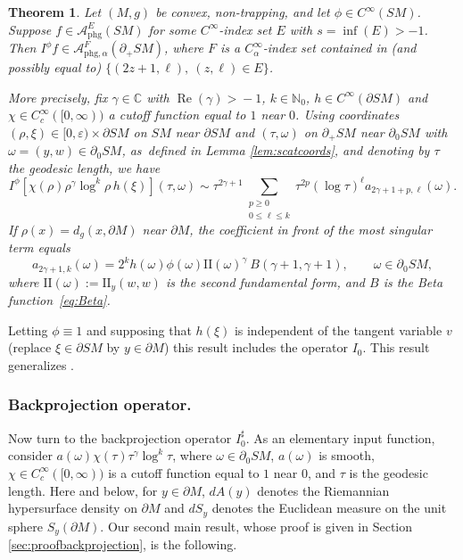 \documentclass[JEP,XML,SOM,Unicode,NoFloatCountersInSection, NoEqCountersInSection,published]{cedram}
\DeclareMathOperator{\Real}{Re}
\theoremstyle{plain}
\newtheorem{Theorem}{Theorem}[section]
\theoremstyle{definition}
\theoremstyle{remark}
\def\Cm{{\mathbb{C}}}
\def\Nm{{\mathbb{N}}}
\def\A{\mathcal{A}}
\def\two{\mathrm{II}}
\newcommand{\adj}{I_0^\sharp}
\newcommand{\del}{\partial}
\newcommand{\phg}{\mathrm{phg}}
\begin{document}
\begin{Theorem} \label{thm:Calphamapping}
Let $(M,g)$ be convex, non-trapping, and let $\phi\in C^\infty(SM)$. Suppose $f \in \A^E_{\phg}(SM)$ for some $C^\infty$-index set $E$ with
$s = \inf(E)>-1$. Then $I^\phi f \in \A^F_{\phg,\alpha}(\del_+ SM)$, where $F$ is a $C^\infty_\alpha$-index set contained in
(and possibly equal to) $\{ (2z+1,\ell), \ (z,\ell)\in E \}$.

More precisely, fix $\gamma\!\!\in\! \Cm$ with $\Real(\gamma)\!>\!-1$, $k\!\!\in\! \Nm_0$, $h\!\!\in\! C^\infty(\partial SM)$ and $\chi\!\!\in\! C_c^\infty([0,\infty))$ a cutoff function equal to $1$ near $0$.
Using coordinates $(\rho,\xi)\in [0,\varepsilon)\times \partial SM$ on $SM$ near $\partial SM$ and $(\tau,\omega)$ on $\partial_+ SM$ near
$\partial_0 SM$ with $\omega = (y,w)\in \partial_0 SM$, as~defined in Lemma \ref{lem:scatcoords}, and denoting by $\tau$ the geodesic length, we have
\begin{equation*}
I^\phi [\chi(\rho)\rho^\gamma \log^k \rho\,h(\xi)] (\tau,\omega) \sim \tau^{2\gamma+1} \sum_{\substack{p\ge 0 \\ 0 \le \ell \le k}} \tau^{2p} (\log\tau)^\ell
a_{2\gamma+1+p,\ell}(\omega).
\end{equation*}
If $\rho(x) = d_g(x,\partial M)$ near $\partial M$, the coefficient in front of the most singular term equals
\begin{equation}
a_{2\gamma+1,k}(\omega) = 2^k h(\omega) \phi(\omega) \two(\omega)^\gamma\ B(\gamma+1,\gamma+1), \qquad \omega\in \partial_0 SM,
\label{eq:I0BottomTerm}
\end{equation}
where $\two(\omega) \!:=\! \two_y(w,w)$ is the second fundamental form, and $B$ is the Beta function~\eqref{eq:Beta}.
\end{Theorem}
Letting $\phi \equiv 1$ and supposing that $h(\xi)$ is independent of the tangent variable $v$ (\ie replace $\xi\in \partial SM$ by $y\in \partial M$)
this result includes the operator $I_0$. This result generalizes \cite[Prop.\,6.13]{Monard2020a}.

\subsubsection*{Backprojection operator.} Now turn to the backprojection operator $\adj $. As an elementary input function, consider
$a(\omega) \chi(\tau) \tau^\gamma \log^k \tau$, where $\omega\in\partial_0 SM$, $a(\omega)$
is smooth, $\chi \in C_c^\infty([0,\infty))$ is a cutoff function equal to $1$ near $0$, and $\tau$ is the geodesic length. Here and below, for $y\in \partial M$, $dA(y)$ denotes the Riemannian hypersurface density on $\partial M$ and $dS_y$ denotes the Euclidean measure on the unit sphere $S_y (\partial M)$. Our second main result, whose proof is given in Section \ref{sec:proofbackprojection}, is the following.
\end{document}
